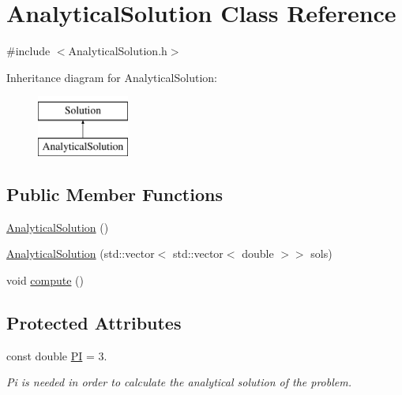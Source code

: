 \hypertarget{class_analytical_solution}{}\section{Analytical\+Solution Class Reference}
\label{class_analytical_solution}


{\ttfamily \#include $<$Analytical\+Solution.\+h$>$}

Inheritance diagram for Analytical\+Solution\+:\begin{figure}[H]
\begin{center}
\leavevmode
\includegraphics[height=2.000000cm]{class_analytical_solution}
\end{center}
\end{figure}
\subsection*{Public Member Functions}
\begin{DoxyCompactItemize}
\item 
\hyperlink{class_analytical_solution_a92a4ce87e863ec7f8aac59372306efd2}{Analytical\+Solution} ()
\item 
\hyperlink{class_analytical_solution_a4c948fe197127ca544ac53b6eb0e5b48}{Analytical\+Solution} (std\+::vector$<$ std\+::vector$<$ double $>$$>$ sols)
\item 
void \hyperlink{class_analytical_solution_ae1ebc556a8dfed55b6c463625545d919}{compute} ()
\end{DoxyCompactItemize}
\subsection*{Protected Attributes}
\begin{DoxyCompactItemize}
\item 
\mbox{\label{class_analytical_solution_a7790fe079a6319530e2d203c5ff64b23}} 
const double \hyperlink{class_analytical_solution_a7790fe079a6319530e2d203c5ff64b23}{PI} = 3.
\begin{DoxyCompactList}\small\item\em Pi is needed in order to calculate the analytical solution of the problem. \end{DoxyCompactList}\end{DoxyCompactItemize}


